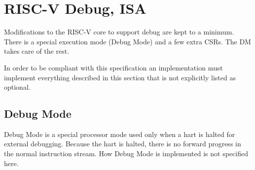 \chapter{RISC-V Debug, ISA}
\label{sec:core_debug}

Modifications to the RISC-V core to support debug are kept to a minimum.  There
is a special execution mode (Debug Mode) and a few extra CSRs. The DM takes care
of the rest.

In order to be compliant with this specification an implementation must
implement everything described in this section that is not explicitly listed as
optional.

\section{Debug Mode} \label{debugmode}

Debug Mode is a special processor mode used only when a hart is halted for
external debugging. Because the hart is halted, there is no forward progress in
the normal instruction stream.
How Debug Mode is implemented is not specified here.


